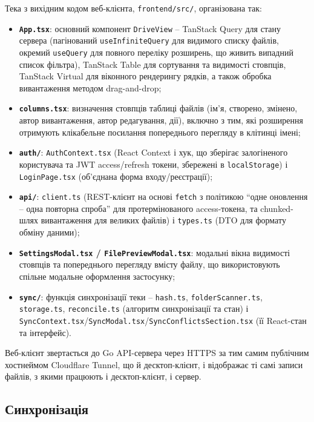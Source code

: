 \documentclass[12pt,a4paper]{article}
\begin{document}
Тека з вихідним кодом веб-клієнта, \texttt{frontend/src/}, організована так:

\begin{itemize}[nosep]
    \item \textbf{\texttt{App.tsx}}: основний компонент \texttt{DriveView} -- TanStack Query для стану сервера (пагінований \texttt{useInfiniteQuery} для видимого списку файлів, окремий \texttt{useQuery} для повного переліку розширень, що живить випадний список фільтра), TanStack Table для сортування та видимості стовпців, TanStack Virtual для віконного рендерингу рядків, а також обробка вивантаження методом drag-and-drop;
    \item \textbf{\texttt{columns.tsx}}: визначення стовпців таблиці файлів (ім'я, створено, змінено, автор вивантаження, автор редагування, дії), включно з тим, які розширення отримують клікабельне посилання попереднього перегляду в клітинці імені;
    \item \textbf{\texttt{auth/}}: \texttt{AuthContext.tsx} (React Context і хук, що зберігає залогіненого користувача та JWT access/refresh токени, збережені в \texttt{localStorage}) і \texttt{LoginPage.tsx} (об'єднана форма входу/реєстрації);
    \item \textbf{\texttt{api/}}: \texttt{client.ts} (REST-клієнт на основі \texttt{fetch} з політикою ``одне оновлення -- одна повторна спроба'' для протермінованого access-токена, та chunked-шлях вивантаження для великих файлів) і \texttt{types.ts} (DTO для формату обміну даними);
    \item \textbf{\texttt{SettingsModal.tsx} / \texttt{FilePreviewModal.tsx}}: модальні вікна видимості стовпців та попереднього перегляду вмісту файлу, що використовують спільне модальне оформлення застосунку;
    \item \textbf{\texttt{sync/}}: функція синхронізації теки -- \texttt{hash.ts}, \texttt{folderScanner.ts}, \texttt{storage.ts}, \texttt{reconcile.ts} (алгоритм синхронізації та стан) і \texttt{SyncContext.tsx}/\texttt{SyncModal.tsx}/\texttt{SyncConflictsSection.tsx} (її React-стан та інтерфейс).
\end{itemize}

Веб-клієнт звертається до Go API-сервера через HTTPS за тим самим публічним хостнеймом Cloudflare Tunnel, що й десктоп-клієнт, і відображає ті самі записи файлів, з якими працюють і десктоп-клієнт, і сервер.

\subsection{Синхронізація}
\end{document}

